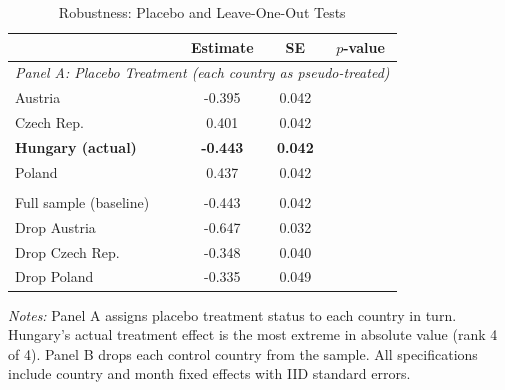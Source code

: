 \begin{table}[H]
\centering
\caption{Robustness: Placebo and Leave-One-Out Tests}
\label{tab:robustness}
\begin{threeparttable}
\begin{tabular}{lccc}
\toprule
 & Estimate & SE & $p$-value \\
\midrule
\multicolumn{4}{l}{\textit{Panel A: Placebo Treatment (each country as pseudo-treated)}} \\
Austria & -0.395 & 0.042 & \\
Czech Rep. & 0.401 & 0.042 & \\
\textbf{Hungary (actual)} & \textbf{-0.443} & \textbf{0.042} & \\
Poland & 0.437 & 0.042 & \\
\addlinespace
\midrule
\multicolumn{4}{l}{\textit{Panel B: Leave-One-Out (dropping each control country)}} \\
Full sample (baseline) & -0.443 & 0.042 & \\
Drop Austria & -0.647 & 0.032 & \\
Drop Czech Rep. & -0.348 & 0.040 & \\
Drop Poland & -0.335 & 0.049 & \\
\bottomrule
\end{tabular}
\begin{tablenotes}[flushleft]
\small
\item \textit{Notes:} Panel A assigns placebo treatment status to each country in turn. Hungary's actual treatment effect is the most extreme in absolute value (rank 4 of 4). Panel B drops each control country from the sample. All specifications include country and month fixed effects with IID standard errors.
\end{tablenotes}
\end{threeparttable}
\end{table}
